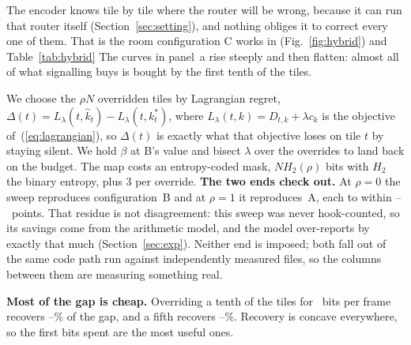 \documentclass[10pt,twocolumn,letterpaper]{article}
\newcommand{\dB}{\,dB}
\begin{document}
\begin{table}[t]
\centering
\resizebox{\columnwidth}{!}{}
\caption{\textbf{Configuration C} at $0.1\dB$. Columns are the fraction of tiles
the encoder overrides; the two end columns reproduce B and A to within
$0.1$ points, which is the check that the interpolation is real.}
\label{tab:hybrid}
\end{table}

The encoder knows tile by tile where the router will be wrong, because it can run
that router itself (Section~\ref{sec:setting}), and nothing obliges it to correct
every one of them. That is the room configuration C works in (Fig.~\ref{fig:hybrid}) and Table~\ref{tab:hybrid} The curves in panel~a rise steeply and then flatten: almost all of what
signalling buys is bought by the first tenth of the tiles.

We choose the $\rho N$ overridden tiles by Lagrangian regret,
$\Delta(t)=L_\lambda(t,\hat{k}_t)-L_\lambda(t,k^{*}_t)$, where
$L_\lambda(t,k) = D_{t,k}+\lambda c_k$ is the objective
of~(\ref{eq:lagrangian}), so $\Delta(t)$ is exactly what that objective loses on
tile $t$ by staying silent. We hold $\beta$ at B's value and bisect $\lambda$
over the overrides to land back on the budget. The map costs an entropy-coded
mask, $N H_2(\rho)$ bits with $H_2$ the binary entropy, plus $3$ per override.
\textbf{The two ends check out.} At $\rho{=}0$ the sweep reproduces configuration~B
and at $\rho{=}1$ it reproduces~A, each to within
\HybridEndOffsetLo--\HybridEndOffsetHi\ points. That residue is not
disagreement: this sweep was never hook-counted, so its savings come from the
arithmetic model, and the model over-reports by exactly that much (Section~\ref{sec:exp}). Neither end is imposed; both fall out of the same code path run
against independently measured files, so the columns between them are measuring
something real.

\textbf{Most of the gap is cheap.} Overriding a tenth of the tiles for
\HybridBitsTenth\ bits per frame recovers
\HybridRecoverTenthLow--\HybridRecoverTenthHigh\% of the gap, and a fifth
recovers \HybridRecoverFifthLow--\HybridRecoverFifthHigh\%. Recovery is concave
everywhere, so the first bits spent are the most useful ones.
\end{document}
